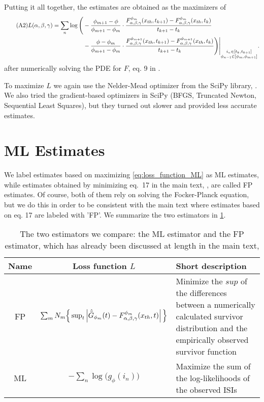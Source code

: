 Putting it all together, the estimates are obtained as the maximizers of 
\begin{align}
\tag{A2}
\label{eq:loss_function_ML}
L(\alpha,\beta,{\gamma }) = \sum_n  \log \Bigg(
&-\frac{\phi_{m+1} - \phi}{\phi_{m+1} - \phi_{m}} \cdot 
\frac{F_{\alpha,\beta,{\gamma }}^{\phi_m}({ x_{th} }, t_{k+1}) - F_{\alpha,\beta,{\gamma }}^{\phi_m}({ x_{th} },
t_{k})}{t_{k+1} - t_{k}}
\\&-
\frac{\phi - \phi_{m}}{\phi_{m+1} - \phi_{m}} \cdot 
\frac{F_{\alpha,\beta,{\gamma }}^{\phi_{m+1}}({ x_{th} }, t_{k+1}) - F_{\alpha,\beta,{\gamma }}^{\phi_{m+1}}({ x_{th} },
t_{k})}{t_{k+1} - t_{k}} 
 \Bigg)
 \Bigg|_{\substack{i_n \in [t_k, t_{k+1}] \\
 			 \phi_{n-1} \in [\phi_m, \phi_{m+1}]}} .
 			 \notag
\end{align} 
after numerically solving the PDE for $F$, eq. 9 in \cite{Iolov2013}. 

To maximize $L$ we again use the Nelder-Mead optimizer from the SciPy library,
\cite{scipy}. We also tried the gradient-based optimizers in SciPy (BFGS,
Truncated Newton, Sequential Least Squares), but they turned out slower and
provided less accurate estimates.
  
\section{ML Estimates}
We label estimates based on maximizing \cref{eq:loss_function_ML} as ML
estimates, while estimates obtained by minimizing eq.\ 17 in the main text, \cite{Iolov2013},
are called FP estimates. Of course, both of them rely on solving the
Focker-Planck equation, but we do this in order to be consistent with the main text
where estimates based on eq. 17 are labeled with 'FP'. We summarize the two
estimators in \cref{tab:estimators}. \begin{table} \begin{tabular}{ccp{4cm}}
Name & Loss function $L$ & Short description
\\
\hline FP &$\sum_{m} N_m \Big\{ \sup_{t} \left| { \hat{{ \bar{G} }} }_{\phi_m}(t) -
F^{\phi_m}_{\alpha,\beta,{\gamma }}({ x_{th} },
t) \right| \Big \}$ & Minimize the $sup$ of the  differences between a
numerically calculated survivor distribution and the empirically observed
survivor function
\\
ML & $-\sum_n  \log \Big( g_\phi(i_n)
 \Big)$
& Maximize the sum of the log-likelihoods of the observed ISIs
 		\\
\hline  \end{tabular}
\caption[Comparison of Maximum Likelihood vs.\ Fokker-Planck distributional
algorithm]{The two estimators we compare: the ML estimator and  the FP
estimator, which has already been discussed at length in the main text,
\cite{Iolov2013}} \label{tab:estimators} \end{table}

